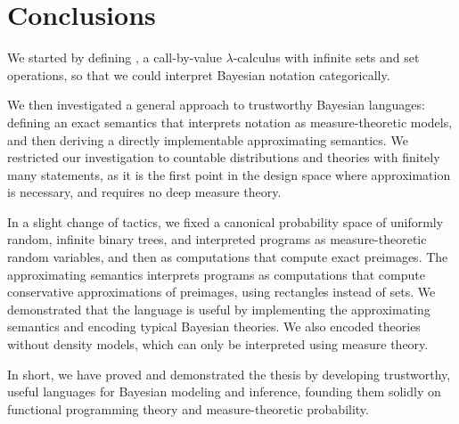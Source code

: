 
\begin{comment}
Jay:

* Ch 12 needs to be more explicitly in terms of the thesis statement if
only in addition to what you have. (i.e. the thing at the end is too
weak a reference for me.)

* 12.2.1 --- how does this relate to the larger goal of prob thy or is it just sharpening your tool?

* The paragraph of loops doesn't really make sense because it has no
context---what are Racket transformers? Why do you want these things?
You're jumping between the scientific progress of expressiveness and
the convenience of using your language as a Bayesian.

* The "lambdas may not be good" is similarly confused; we don't know why
you would think that.
\end{comment}


\section{Conclusions}

We started by defining \lzfclang, a call-by-value $\lambda$-calculus with infinite sets and set operations, so that we could interpret Bayesian notation categorically.

We then investigated a general approach to trustworthy Bayesian languages: defining an exact semantics that interprets notation as measure-theoretic models, and then deriving a directly implementable approximating semantics.
We restricted our investigation to countable distributions and theories with finitely many statements, as it is the first point in the design space where approximation is necessary, and requires no deep measure theory.

In a slight change of tactics, we fixed a canonical probability space of uniformly random, infinite binary trees, and interpreted programs as measure-theoretic random variables, and then as computations that compute exact preimages.
The approximating semantics interprets programs as computations that compute conservative approximations of preimages, using rectangles instead of sets.
We demonstrated that the language is useful by implementing the approximating semantics and encoding typical Bayesian theories.
We also encoded theories without density models, which can only be interpreted using measure theory.

In short, we have proved and demonstrated the thesis by developing trustworthy, useful languages for Bayesian modeling and inference, founding them solidly on functional programming theory and measure-theoretic probability.

